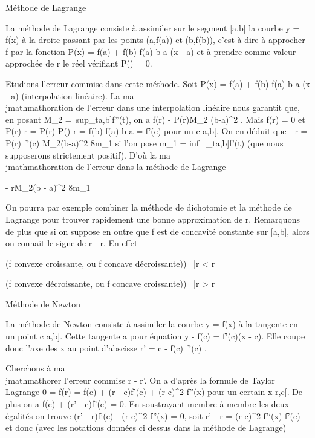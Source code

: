 \documentclass[]{article}
\begin{document}
Méthode de Lagrange

La méthode de Lagrange consiste à assimiler sur le segment {[}a,b{]} la
courbe y = f(x) à la droite passant par les points (a,f(a)) et (b,f(b)),
c'est-à-dire à approcher f par la fonction P(x) = f(a) + f(b)-f(a)
\over b-a (x - a) et à prendre comme valeur approchée
de r le réel \barr vérifiant
P(\barr) = 0.

Etudions l'erreur commise dans cette méthode. Soit P(x) = f(a) +
f(b)-f(a) \over b-a (x - a) (interpolation linéaire).
La ma\\jmathmathoration de l'erreur dans une interpolation linéaire nous garantit
que, en posant M_2 =\
sup_t\in{[}a,b{]}f''(t), on a f(r)
- P(r)\leq M_2 (b-a)^2  . Mais f(r) = 0 et  P(r) \over
r-\barr = P(r)-P(\barr)
\over r-\barr = f(b)-f(a)
\over b-a = f'(c) pour un c \in{]}a,b{[}. On en déduit
que \barr - r =
\left  P(r) \over f'(c)
\right \leq M_2(b-a)^2
\over 8m_1 si l'on pose m_1
= inf~
_t\in{[}a,b{]}f'(t) (que nous supposerons
strictement positif). D'où la ma\\jmathmathoration de l'erreur dans la méthode de
Lagrange

\barr - r\leq M_2(b -
a)^2 \over 8m_1

On pourra par exemple combiner la méthode de dichotomie et la méthode de
Lagrange pour trouver rapidement une bonne approximation de r.
Remarquons de plus que si on suppose en outre que f est de concavité
constante sur {[}a,b{]}, alors on connait le signe de r
-\bar r. En effet

(f convexe croissante, ou f concave décroissante))
\rigtharrow~\bar r \textless{} r

(f convexe décroissante, ou f concave croissante))
\rigtharrow~\bar r \textgreater{} r

Méthode de Newton

La méthode de Newton consiste à assimiler la courbe y = f(x) à la
tangente en un point c \in {[}a,b{]}. Cette tangente a pour équation y -
f(c) = f'(c)(x - c). Elle coupe donc l'axe des x au point d'abscisse r'
= c - f(c) \over f'(c) .

Cherchons à ma\\jmathmathorer l'erreur commise r - r'. On a
d'après la formule de Taylor Lagrange 0 = f(r) = f(c) + (r - c)f'(c) +
(r-c)^2 \over 2 f''(x) pour un certain x
\in{]}r,c{[}. De plus on a f(c) + (r' - c)f'(c) = 0. En soustrayant membre
à membre les deux égalités on trouve (r' - r)f'(c) -
(r-c)^2  f''(x) = 0, soit r' - r =
(r-c)^2 \over 2  f'`(x)
\over f'(c) et donc (avec les notations données ci
dessus dans la méthode de Lagrange)
\end{document}
